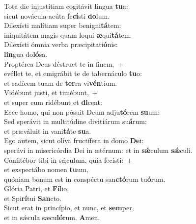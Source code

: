 \evenverse Tota die injustítiam cogitávit lingua \textbf{tu}a:~\*\\
\evenverse sicut novácula acúta fe\textbf{cí}sti \textbf{do}lum.\\
\oddverse Dilexísti malítiam super benigni\textbf{tá}tem:~\*\\
\oddverse iniquitátem magis quam loqui \textbf{æ}qui\textbf{tá}tem.\\
\evenverse Dilexísti ómnia verba præcipitati\textbf{ó}nis:~\*\\
\evenverse \textbf{lin}gua do\textbf{ló}sa.\\
\oddverse Proptérea Deus déstruet te in finem,~+\\
\oddverse  evéllet te, et emigrábit te de tabernáculo \textbf{tu}o:~\*\\
\oddverse et radícem tuam de \textbf{ter}ra vi\textbf{vén}tium.\\
\evenverse Vidébunt justi, et timébunt,~+\\
\evenverse  et super eum ridébunt et \textbf{di}cent:~\*\\
\evenverse Ecce homo, qui non pósuit Deum adju\textbf{tó}rem \textbf{su}um:\\
\oddverse Sed sperávit in multitúdine divitiárum su\textbf{á}rum:~\*\\
\oddverse et præváluit in vani\textbf{tá}te \textbf{su}a.\\
\evenverse Ego autem, sicut olíva fructífera in domo \textbf{De}i:~\*\\
\evenverse sperávi in misericórdia Dei in ætérnum: et in \textbf{sǽ}culum \textbf{sǽ}culi.\\
\oddverse Confitébor tibi in sǽculum, quia fecísti:~+\\
\oddverse  et exspectábo nomen \textbf{tu}um,~\*\\
\oddverse quóniam bonum est in conspéctu san\textbf{ctó}rum tu\textbf{ó}rum.\\
\evenverse Glória Patri, et \textbf{Fí}lio,~\*\\
\evenverse et Spi\textbf{rí}tui \textbf{San}cto.\\
\oddverse Sicut erat in princípio, et nunc, et \textbf{sem}per,~\*\\
\oddverse et in sǽcula sæcu\textbf{ló}rum. \textbf{A}men.\\
